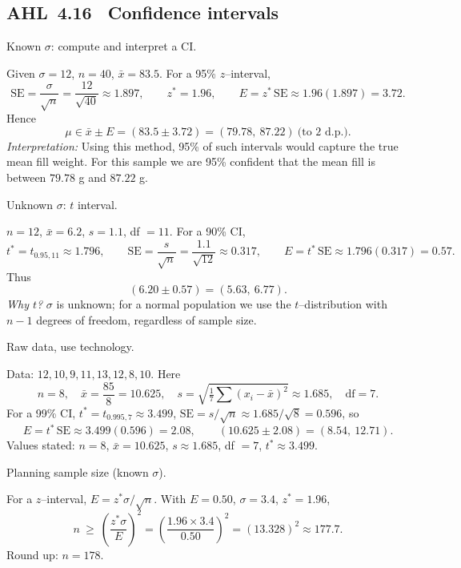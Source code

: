 \documentclass[11pt]{article}
\def\textbf#1{#1}%
\newcommand{\tocsubsection}[1]{\subsection{#1}}
\begin{document}

\tocsubsection{AHL 4.16 \; Confidence intervals}


\begin{solution}
\textbf{Known $\sigma$: compute and interpret a CI.}

Given $\sigma=12$, $n=40$, $\bar x=83.5$. For a 95\% $z$–interval,
\[
\text{SE}=\frac{\sigma}{\sqrt{n}}=\frac{12}{\sqrt{40}}\approx 1.897,\qquad
z^{\ast}=1.96,\qquad
E=z^{\ast}\,\text{SE}\approx 1.96(1.897)=3.72.
\]
Hence
\[
\mu\in \bar x\pm E=(83.5\pm 3.72)=\boxed{(79.78,\ 87.22)}\ \text{(to 2 d.p.)}.
\]
\emph{Interpretation:} Using this method, 95\% of such intervals would capture the true mean fill weight. For this sample we are 95\% confident that the mean fill is between $79.78$ g and $87.22$ g.
\end{solution}

\begin{solution}
\textbf{Unknown $\sigma$: $t$ interval.}

$n=12$, $\bar x=6.2$, $s=1.1$, df $=11$. For a 90\% CI,
\[
t^{\ast}=t_{0.95,11}\approx 1.796,\qquad
\text{SE}=\frac{s}{\sqrt{n}}=\frac{1.1}{\sqrt{12}}\approx 0.317,\qquad
E=t^{\ast}\,\text{SE}\approx 1.796(0.317)=0.57.
\]
Thus
\[
\boxed{(6.20\pm 0.57)=(5.63,\ 6.77)}.
\]
\emph{Why $t$?} $\sigma$ is unknown; for a normal population we use the $t$–distribution with $n-1$ degrees of freedom, regardless of sample size.
\end{solution}

\begin{solution}
\textbf{Raw data, use technology.}

Data: $12,10,9,11,13,12,8,10$. Here
\[
n=8,\quad \bar x=\frac{85}{8}=10.625,\quad s=\sqrt{\tfrac{1}{7}\sum(x_i-\bar x)^2}\approx 1.685,\quad \text{df}=7.
\]
For a 99\% CI, $t^{\ast}=t_{0.995,7}\approx 3.499$, $\text{SE}=s/\sqrt{n}\approx 1.685/\sqrt{8}=0.596$, so
\[
E=t^{\ast}\,\text{SE}\approx 3.499(0.596)=2.08,\qquad
\boxed{(10.625\pm 2.08)=(8.54,\ 12.71)}.
\]
Values stated: $n=8$, $\bar x=10.625$, $s\approx 1.685$, df $=7$, $t^{\ast}\approx 3.499$.
\end{solution}

\begin{solution}
\textbf{Planning sample size (known $\sigma$).}

For a $z$–interval, $E=z^{\ast}\sigma/\sqrt{n}$. With $E=0.50$, $\sigma=3.4$, $z^{\ast}=1.96$,
\[
n\ \ge\ \left(\frac{z^{\ast}\sigma}{E}\right)^2=\left(\frac{1.96\times 3.4}{0.50}\right)^2
=\left(13.328\right)^2\approx 177.7.
\]
Round up: $\boxed{n=178}$.
\end{solution}
\end{document}
